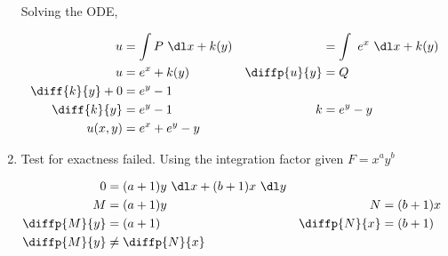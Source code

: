 \begin{enumerate}
          Solving the ODE,

          \begin{align}
              u               & = \int P\ \dl x + k(y)      &
                              & = \int\ e^{x}\ \dl x + k(y)   \\
              u               & = e^{x} + k(y)              &
              \diffp{u}{y}    & = Q                           \\
              \diff{k}{y} + 0 & = e^{y} - 1                   \\
              \diff{k}{y}     & = e^{y} - 1                 &
              k               & = e^{y} - y                   \\
              u(x, y)         & = e^{x} + e^{y} - y
          \end{align}


          \begin{figure}[H]
              \centering
          \end{figure}

    \item Test for exactness failed. Using the integration factor given
          $ F = x^{a}y^{b} $

          \begin{align}
              0            & = (a+1)y\ \dl x + (b+1)x\ \dl y   \\
              M            & = (a+1)y                        &
              N            & = (b+1)x                          \\
              \diffp{M}{y} & = (a+1)                         &
              \diffp{N}{x} & = (b+1)                           \\
              \diffp{M}{y} & \neq \diffp{N}{x}
          \end{align}


\end{enumerate}
